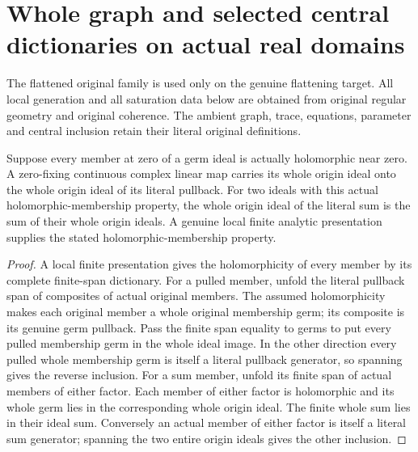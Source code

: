 \section{Whole graph and selected central dictionaries on actual real domains}

The flattened original family is used only on the genuine flattening target.
All local generation and all saturation data below are obtained from original
regular geometry and original coherence. The ambient graph, trace, equations,
parameter and central inclusion retain their literal original definitions.

\begin{lemma}
\label{hir:real-domain-whole-linear-pullback-and-sum-dictionary}
\leanok
Suppose every member at zero of a germ ideal is actually holomorphic near
zero. A zero-fixing continuous complex linear map carries its whole origin
ideal onto the whole origin ideal of its literal pullback. For two ideals
with this actual holomorphic-membership property, the whole origin ideal of
the literal sum is the sum of their whole origin ideals. A genuine local
finite analytic presentation supplies the stated holomorphic-membership
property.
\end{lemma}
\begin{proof}
A local finite presentation gives the holomorphicity of every member by its
complete finite-span dictionary. For a pulled member, unfold the literal
pullback span of composites of actual original members. The assumed
holomorphicity makes each original member a whole original membership germ;
its composite is its genuine germ pullback. Pass the finite span equality
to germs to put every pulled membership germ in the whole ideal image. In the
other direction every pulled whole membership germ is itself a literal
pullback generator, so spanning gives the reverse inclusion. For a sum
member, unfold its finite span of actual members of either factor. Each
member of either factor is holomorphic and its whole germ lies in the
corresponding whole origin ideal. The finite whole sum lies in their ideal
sum. Conversely an actual member of either factor is itself a literal sum
generator; spanning the two entire origin ideals gives the other inclusion.
\end{proof}

